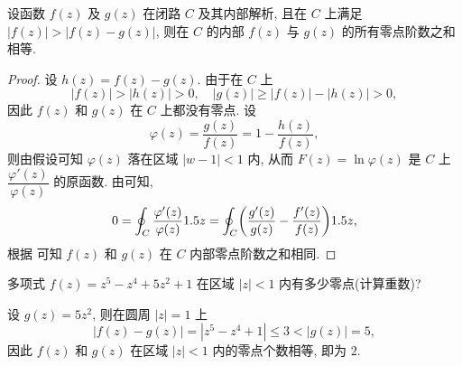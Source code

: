 
\begin{theorem}[儒歇定理]
  \label{thm:rouche}
  设函数 $f(z)$ 及 $g(z)$ 在闭路 $C$ 及其内部解析, 且在 $C$ 上满足 $|f(z)|>|f(z)-g(z)|$, 则在 $C$ 的内部 $f(z)$ 与 $g(z)$ 的所有零点阶数之和相等.
\end{theorem}

\begin{proof}
  设 $h(z)=f(z)-g(z)$.
  由于在 $C$ 上
  \[
    |f(z)|>|h(z)|>0,\quad
    |g(z)|\ge |f(z)|-|h(z)|>0,
  \]
  因此 $f(z)$ 和 $g(z)$ 在 $C$ 上都没有零点.
  设
  \[
    \varphi(z)=\frac{g(z)}{f(z)}=1-\frac{h(z)}{f(z)},
  \]
  则由假设可知 $\varphi(z)$ 落在区域 $|w-1|<1$ 内, 从而 $F(z)=\ln\varphi(z)$ 是 $C$ 上 $\dfrac{\varphi'(z)}{\varphi(z)}$ 的原函数.
  由\thmNL 可知,
  \[
     0
    =\oint_C\frac{\varphi'(z)}{\varphi(z)}1.5 z
    =\oint_C\biggl(\frac{g'(z)}{g(z)}-\frac{f'(z)}{f(z)}\biggr)1.5 z,
  \]
  根据 可知 $f(z)$ 和 $g(z)$ 在 $C$ 内部零点阶数之和相同.
\end{proof}

\begin{example}
  多项式 $f(z)=z^5-z^4+5z^2+1$ 在区域 $|z|<1$ 内有多少零点(计算重数)?
\end{example}

\begin{solution}
  设 $g(z)=5z^2$, 则在圆周 $|z|=1$ 上
  \[
    |f(z)-g(z)|=|z^5-z^4+1|\le 3<|g(z)|=5,
  \]
  因此 $f(z)$ 和 $g(z)$ 在区域 $|z|<1$ 内的零点个数相等, 即为 $2$.
\end{solution}

